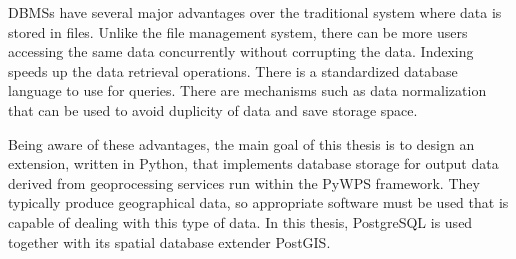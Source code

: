 	DBMSs have several major advantages over the traditional system where data is stored in files. Unlike the file management system, there can be more users accessing the same data concurrently without corrupting the data. Indexing speeds up the data retrieval operations. There is a standardized database language to use for queries. There are mechanisms such as data normalization that can be used to avoid duplicity of data and save storage space.
	
	Being aware of these advantages, the main goal of this thesis is to design an extension, written in Python, that implements database storage for output data derived from geoprocessing services run within the PyWPS framework. They typically produce geographical data, so appropriate software must be used that is capable of dealing with this type of data. In this thesis, PostgreSQL is used together with its spatial database extender PostGIS.


	

